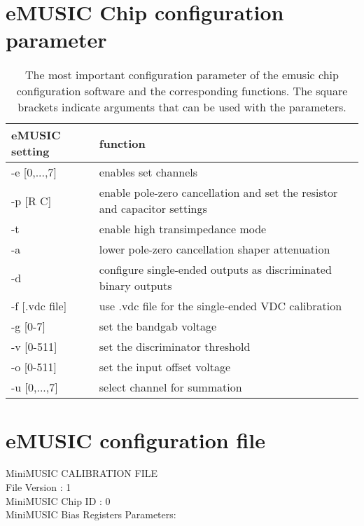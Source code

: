 \section*{eMUSIC Chip configuration parameter}
\begin{table}
	\centering
	\caption[eMUSCI configuration parameter]{The most important configuration parameter of the \ac{emusic} chip configuration software and the corresponding functions. The square brackets indicate arguments that can be used with the parameters.}
	\label{tab:emusic\_config}
	\begin{tabularx}{\textwidth}{X|X}\toprule
		eMUSIC setting & function \\\midrule
		-e [0,...,7] & enables set channels \\ 
		-p [R C] & enable pole-zero cancellation and set the resistor and capacitor settings \\ 
		-t & enable high transimpedance mode \\ 
		-a & lower pole-zero cancellation shaper attenuation \\ 
		-d & configure single-ended outputs as discriminated binary outputs \\ 
		-f [.vdc file] & use .vdc file for the single-ended VDC calibration \\ 
		-g [0-7] & set the bandgab voltage \\ 
		-v [0-511] & set the discriminator threshold \\ 
		-o [0-511] & set the input offset voltage \\
		-u [0,...,7] & select channel for summation \\ 
		\bottomrule
	\end{tabularx}
\end{table}

\section*{eMUSIC configuration file}
\label{sec:settings}
MiniMUSIC CALIBRATION FILE\\

File Version     : 1\\
MiniMUSIC Chip ID    : 0\\

MiniMUSIC Bias Registers Parameters:\\

